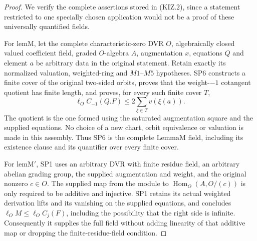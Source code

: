 \documentclass[11pt,a4paper]{article}
\numberwithin{equation}{section}
\theoremstyle{remark}\newtheorem{remark}[theorem]{Remark}
\begin{document}
\begin{proof}
We verify the complete assertions stored in (KIZ.2), since a
statement restricted to one specially chosen application would not
be a proof of these universally quantified fields.

For \(\mathrm{lemM}\), let the complete characteristic-zero DVR
\(O\), algebraically closed valued coefficient field, graded
\(O\)-algebra \(A\), augmentation \(x\), equations \(Q\)
and element \(a\) be arbitrary data in the original statement.
Retain exactly its normalized valuation, weighted-ring and
\(M1\)--\(M5\) hypotheses.  SP6 constructs a finite cover of
the original two-sided orbits, proves that the weight-\(-1\)
cotangent quotient has finite length, and proves, for every such
finite cover \(T\),
\[
 \ell_O C_{-1}(Q.F)
             \le 2\sum_{\xi\in T}v(\xi(a)).
 \tag{KIZ.3}
\]
The quotient is the one formed using the saturated augmentation
square and the supplied equations.  No choice of a new chart,
orbit equivalence or valuation is made in this assembly.  Thus SP6
is the complete \(\mathrm{LemmaM}\) field, including its
existence clause and its quantifier over every finite cover.

For \(\mathrm{lemM'}\), SP1 uses an arbitrary DVR with finite
residue field, an arbitrary abelian grading group, the supplied
augmentation and weight, and the original nonzero \(c\in O\).
The supplied map from the module to
\(\operatorname{Hom}_O(A,O/(c))\) is only required to be
additive and injective.  SP1 retains its actual weighted derivation
lifts and its vanishing on the supplied equations, and concludes
\(\ell_O M\le\ell_O C_j(F)\), including the possibility that
the right side is infinite.  Consequently it supplies the full
field without adding linearity of that additive map or dropping
the finite-residue-field condition.


\end{proof}
\end{document}
